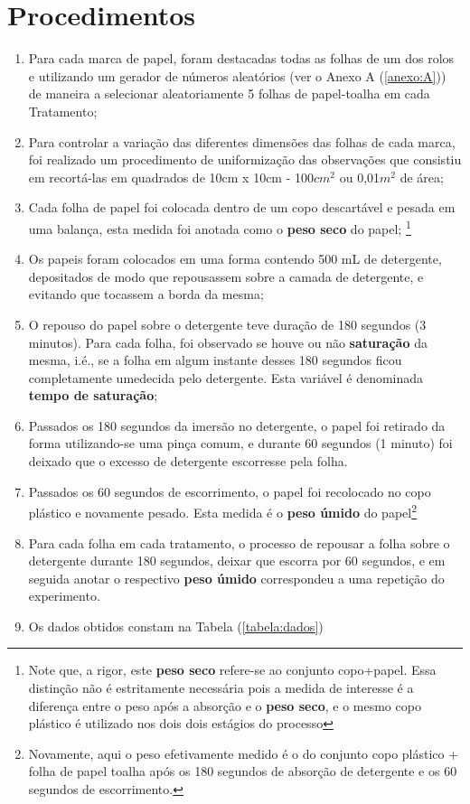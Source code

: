 \documentclass[a4paper,12pt,notitlepage]{article}
\begin{document}
\section{Procedimentos}\label{sec:procedimentos}
\begin{enumerate}
    \item Para cada marca de papel, foram destacadas todas as folhas de um dos rolos e utilizando um gerador de números aleatórios (ver o Anexo A (\ref{anexo:A})) de maneira a selecionar aleatoriamente 5 folhas de papel-toalha em cada Tratamento; 
    \item Para controlar a variação das diferentes dimensões das folhas de cada marca, foi realizado um procedimento de uniformização das observações que consistiu em recortá-las em quadrados de 10cm x 10cm - 100$cm^2$ ou 0,01$m^2$ de área;
    \item Cada folha de papel foi colocada dentro de um copo descartável e pesada em uma balança, esta medida foi anotada como o \textbf{peso seco} do papel; \footnote{Note que, a rigor, este \textbf{peso seco} refere-se ao conjunto copo+papel. Essa distinção não é estritamente necessária pois a medida de interesse é a diferença entre o peso após a absorção e o \textbf{peso seco}, e o mesmo copo plástico é utilizado nos dois dois estágios do processo} 
    \item Os papeis foram colocados em uma forma contendo 500 mL de detergente, depositados de modo que repousassem sobre a camada de detergente, e evitando que tocassem a borda da mesma;
    \item O repouso do papel sobre o detergente teve duração de 180 segundos (3 minutos). Para cada folha, foi observado se houve ou não \textbf{saturação} da mesma, i.é., se a folha em algum instante desses 180 segundos ficou completamente umedecida pelo detergente. Esta variável é denominada \textbf{tempo de saturação};
    \item Passados os 180 segundos da imersão no detergente, o papel foi retirado da forma utilizando-se uma pinça comum, e durante 60 segundos (1 minuto) foi deixado que o excesso de detergente escorresse pela folha. 
    \item Passados os 60 segundos de escorrimento, o papel foi recolocado no copo plástico e novamente pesado. Esta medida é o \textbf{peso úmido} do papel\footnote{Novamente, aqui o peso efetivamente medido é o do conjunto copo plástico + folha de papel toalha após os 180 segundos de absorção de detergente e os 60 segundos de escorrimento.}
    \item Para cada folha em cada tratamento, o processo de repousar a folha sobre o detergente durante 180 segundos, deixar que escorra por 60 segundos, e em seguida anotar o respectivo \textbf{peso úmido} correspondeu a uma repetição do experimento.
    \item Os dados obtidos constam na Tabela (\ref{tabela:dados})
\end{enumerate}
\end{document}
